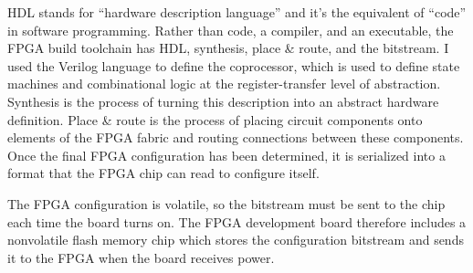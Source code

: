 HDL stands for ``hardware description language'' and it's the equivalent of ``code'' in software programming. Rather than code, a compiler, and an executable, the FPGA build toolchain has HDL, synthesis, place \& route, and the bitstream. I used the Verilog language to define the coprocessor, which is used to define state machines and combinational logic at the register-transfer level of abstraction. Synthesis is the process of turning this description into an abstract hardware definition. Place \& route is the process of placing circuit components onto elements of the FPGA fabric and routing connections between these components. Once the final FPGA configuration has been determined, it is serialized into a format that the FPGA chip can read to configure itself\cite{IceStorm}.

The FPGA configuration is volatile, so the bitstream must be sent to the chip each time the board turns on. The FPGA development board therefore includes a nonvolatile flash memory chip which stores the configuration bitstream and sends it to the FPGA when the board receives power\cite{iCEBreaker}.
